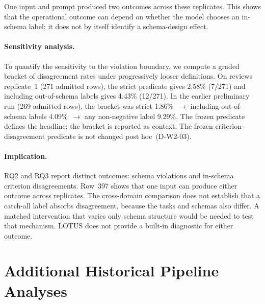 \documentclass[11pt]{article}
\begin{document}
\noindent
One input and prompt produced two outcomes across these replicates. This
shows that the operational outcome can depend on whether the model chooses an
in-schema label; it does not by itself identify a schema-design effect.

\paragraph{Sensitivity analysis.}
To quantify the sensitivity to the violation boundary, we compute a graded
bracket of disagreement rates under progressively looser definitions.
On reviews replicate~1 (271 admitted rows), the strict predicate gives
2.58\% (7/271) and including out-of-schema labels gives 4.43\% (12/271).
In the earlier preliminary run (269 admitted rows), the bracket was strict
1.86\%~$\to$ including out-of-schema labels 4.09\%~$\to$ any non-negative
label 9.29\%.  The
frozen predicate defines the headline; the bracket is reported as context.
The frozen criterion-disagreement predicate is not changed post hoc~(D-W2-03).

\paragraph{Implication.}
RQ2 and RQ3 report distinct outcomes: schema violations and in-schema
criterion disagreements. Row~397 shows that one input can produce either
outcome across replicates. The cross-domain comparison does not establish
that a catch-all label absorbs disagreement, because the tasks and schemas
also differ. A matched intervention that varies only schema structure would
be needed to test that mechanism. LOTUS does not provide a built-in diagnostic
for either outcome.


\section{Additional Historical Pipeline Analyses}
\label{app:rq3-details}
\end{document}
